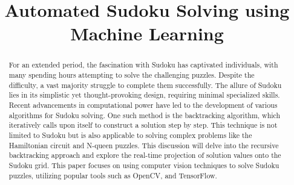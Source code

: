 \documentclass[conference]{IEEEtran}
\begin{document}
\title{Automated Sudoku Solving using Machine Learning}

\author{
\and
{}
\and
{}
\and
{}
\and
{}
}

\maketitle

\begin{abstract}
For an extended period, the fascination with Sudoku has captivated individuals, with many spending hours attempting to solve the challenging puzzles. Despite the difficulty, a vast majority struggle to complete them successfully. The allure of Sudoku lies in its simplistic yet thought-provoking design, requiring minimal specialized skills. Recent advancements in computational power have led to the development of various algorithms for Sudoku solving. One such method is the backtracking algorithm, which iteratively calls upon itself to construct a solution step by step. This technique is not limited to Sudoku but is also applicable to solving complex problems like the Hamiltonian circuit and N-queen puzzles. This discussion will delve into the recursive backtracking approach and explore the real-time projection of solution values onto the Sudoku grid. This paper focuses on using computer vision techniques to solve Sudoku puzzles, utilizing popular tools such as OpenCV, and TensorFlow.
\end{abstract}
\end{document}
